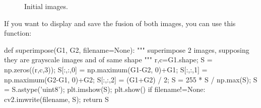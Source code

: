 \begin{figure}[htbp]
\centering\caption{Initial images.}%
 \hfill
 \hfill
 \label{fig:registration:python:initial}%
\end{figure}

If you want to display and save the fusion of both images, you can use this function:
\begin{python}
def superimpose(G1, G2, filename=None):
    """
    superimpose 2 images, supposing they are grayscale images and of same shape
    """
    r,c=G1.shape;
    S = np.zeros((r,c,3));
    S[:,:,0] = np.maximum(G1-G2, 0)+G1;
    S[:,:,1] = np.maximum(G2-G1, 0)+G2;
    S[:,:,2] = (G1+G2) / 2;
    S = 255 * S / np.max(S);
    S = S.astype('uint8');
    plt.imshow(S);
    plt.show()    
    if filename!=None:
        cv2.imwrite(filename, S);
    return S
\end{python}


